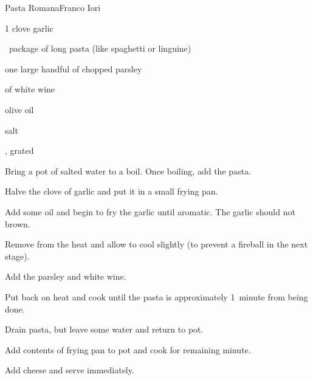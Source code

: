 \begin{recipe}{Pasta Romana}{Franco Iori}{}

\begin{ingredients}
\item 1 clove garlic
\item \half{}~package of long pasta (like spaghetti or linguine)
\item one large handful of chopped parsley
\item \C{\half} of white wine
\item olive oil
\item salt
\item {}, grated
\end{ingredients}

\begin{directions}
\item Bring a pot of salted water to a boil. Once boiling, add the pasta.
\item Halve the clove of garlic and put it in a small frying pan.
\item Add some oil and begin to fry the garlic until aromatic. The garlic should not brown.
\item Remove from the heat and allow to cool slightly (to prevent a fireball in the next stage).
\item Add the parsley and white wine.
\item Put back on heat and cook until the pasta is approximately 1~minute from being done.
\item Drain pasta, but leave some water and return to pot.
\item Add contents of frying pan to pot and cook for remaining minute.
\item Add cheese and serve immediately.
\end{directions}

\end{recipe}

